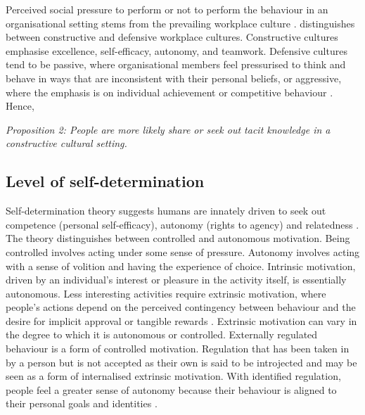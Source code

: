 Perceived social pressure to perform or not to perform the behaviour in an organisational setting stems from the prevailing workplace culture \citep{papadopoulos2013exploring}. \citet{cooke1988behavioral} distinguishes between constructive and defensive workplace cultures. Constructive cultures emphasise excellence, self-efficacy, autonomy, and teamwork. Defensive cultures tend to be passive, where organisational members feel pressurised to think and behave in ways that are inconsistent with their personal beliefs, or aggressive, where the emphasis is on individual achievement or competitive behaviour \citep{cooke1988behavioral}. Hence,  \medskip

\emph{Proposition 2: People are more likely share or seek out tacit knowledge in a constructive cultural setting.}

\subsection{Level of self-determination}

Self-determination theory suggests humans are innately driven to seek out competence (personal self-efficacy), autonomy (rights to agency) and relatedness \citep{ryan2000self}. The theory distinguishes between controlled and autonomous motivation. Being controlled involves acting under some sense of pressure. Autonomy involves acting with a sense of volition and having the experience of choice. Intrinsic motivation, driven by an individual’s interest or pleasure in the activity itself, is essentially autonomous. Less interesting activities require extrinsic motivation, where people's actions depend on the perceived contingency between behaviour and the desire for implicit approval or tangible rewards \citep{gagne2005self}. Extrinsic motivation can vary in the degree to which it is autonomous or controlled. Externally regulated behaviour is a form of controlled motivation. Regulation that has been taken in by a person but is not accepted as their own is said to be introjected and may be seen as a form of internalised extrinsic motivation. With identified regulation, people feel a greater sense of autonomy because their behaviour is aligned to their personal goals and identities \citep{gagne2005self}. \medskip

